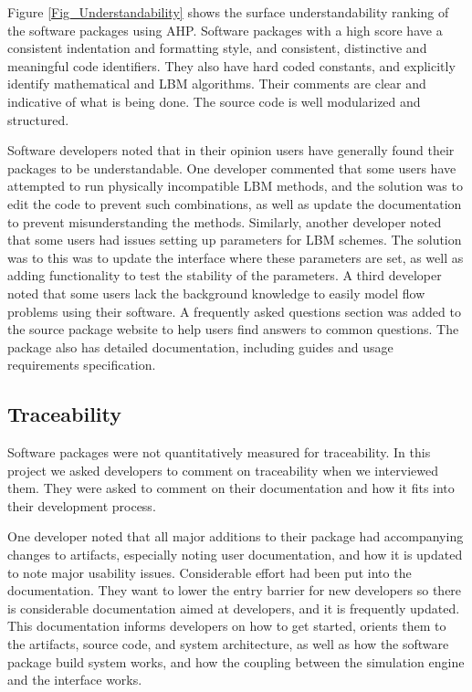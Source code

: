 \documentclass[12pt, notitlepage]{article}
\begin{document}
Figure \ref{Fig_Understandability} shows the surface understandability ranking of the software packages using AHP. Software packages with a high score have a consistent indentation and formatting style, and consistent, distinctive and meaningful code identifiers. They also have hard coded constants, and explicitly identify mathematical and LBM algorithms. Their comments are clear and indicative of what is being done. The source code is well modularized and structured.  

Software developers noted that in their opinion users have generally found their packages to be understandable. One developer commented that some users have attempted to run physically incompatible LBM methods, and the solution was to edit the code to prevent such combinations, as well as update the documentation to prevent misunderstanding the methods. Similarly, another developer noted that some users had issues setting up parameters for LBM schemes. The solution was to this was to update the interface where these parameters are set, as well as adding functionality to test the stability of the parameters. A third developer noted that some users lack the background knowledge to easily model flow problems using their software. A frequently asked questions section was added to the source package website to help users find answers to common questions. The package also has detailed documentation, including guides and usage requirements specification.

\subsection{Traceability}

Software packages were not quantitatively measured for traceability.
In this project we asked developers to comment on traceability when we interviewed them. They were asked to comment on their documentation and how it fits into their development process. 

One developer noted that all major additions to their package had accompanying changes to artifacts, especially noting user documentation, and how it is updated to note major usability issues. Considerable effort had been put into the documentation. They want to lower the entry barrier for new developers so there is considerable documentation aimed at developers, and it is frequently updated. This documentation informs developers on how to get started, orients them to the artifacts, source code, and system architecture, as well as how the software package build system works, and how the coupling between the simulation engine and the interface works. 
\end{document}
